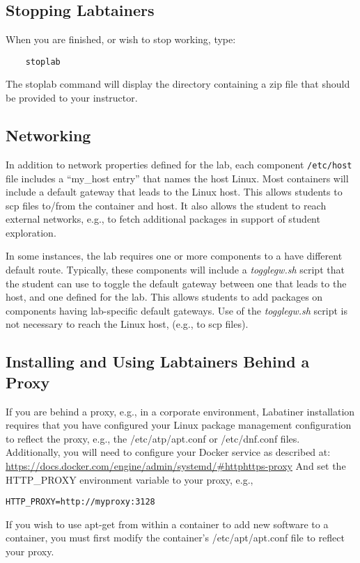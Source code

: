 \documentclass[12pt]{article}
\begin{document}
\subsection{Stopping Labtainers}
When you are finished, or wish to stop working, type:
\begin{verbatim}
    stoplab
\end{verbatim}
\noindent The stoplab command will display the directory containing a zip file that should be provided to your instructor.
\subsection{Networking}
In addition to network properties defined for the lab,
each component \texttt{/etc/host} file includes a ``my\_host entry'' that names
the host Linux.  Most containers will include a default gateway that
leads to the Linux host.  This allows students to scp files to/from the container and host.
It also allows the student to reach external networks, e.g., to fetch additional packages in
support of student exploration.

In some instances, the lab requires one or more components to a have different default route.
Typically, these components will include a \textit{togglegw.sh} script that the student
can use to toggle the default gateway between one that leads to the host, and one defined for the lab.
This allows students to add packages on components having lab-specific default gateways.
Use of the \textit{togglegw.sh} script is not necessary to reach the Linux host, (e.g., to scp files).

\subsection{Installing and Using Labtainers Behind a Proxy}
If you are behind a proxy, e.g., in a corporate environment, Labatiner installation
requires that you have configured your Linux package management configuration to reflect
the proxy, e.g., the /etc/atp/apt.conf or /etc/dnf.conf files.  Additionally,
you will need to configure your Docker service as described at:
\url{https://docs.docker.com/engine/admin/systemd/#httphttps-proxy}
And set the HTTP\_PROXY environment variable to your proxy, e.g., 
\begin{verbatim}
HTTP_PROXY=http://myproxy:3128
\end{verbatim}
If you wish to use apt-get from within a container to add new software to a container, you
must first modify the container's /etc/apt/apt.conf file to reflect your proxy.
\end{document}

